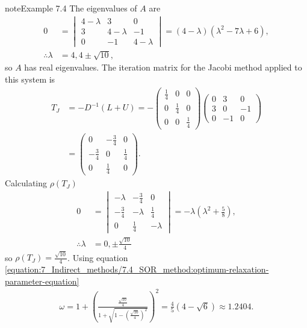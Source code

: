 \documentclass[letterpaper,10pt,english]{jupyterBook}
\begin{document}
\begin{sphinxadmonition}{note}{Example 7.4}
\sphinxAtStartPar
The eigenvalues of \(A\) are
\begin{align*}
    0 &= \begin{vmatrix}
        4 - \lambda & 3 & 0 \\
        3 & 4 - \lambda & -1 \\
        0 & -1 & 4 - \lambda
    \end{vmatrix}
    = (4 - \lambda)(\lambda^2 - 7\lambda + 6), \\
    \therefore \lambda &= 4, 4 \pm \sqrt{10},
\end{align*}
\sphinxAtStartPar
so \(A\) has real eigenvalues. The iteration matrix for the Jacobi method applied to this system is
\begin{align*}
    T_J &= -D^{-1}(L + U)
    = - \begin{pmatrix}
        \frac{1}{4} & 0 & 0 \\ 
        0 & \frac{1}{4} & 0 \\
        0 & 0 & \frac{1}{4}
    \end{pmatrix}
    \begin{pmatrix}
        0 & 3 & 0 \\
        3 & 0 & -1 \\
        0 & -1 & 0 
    \end{pmatrix} \\
    &= \begin{pmatrix}
        0 & -\frac{3}{4} & 0 \\
        -\frac{3}{4} & 0 & \frac{1}{4} \\
        0 & \frac{1}{4} & 0
    \end{pmatrix}.
\end{align*}
\sphinxAtStartPar
Calculating \(\rho(T_J)\)
\begin{align*}
    0 &= \begin{vmatrix}
        -\lambda & -\frac{3}{4} & 0 \\
        -\frac{3}{4} & -\lambda & \frac{1}{4} \\
        0 & \frac{1}{4} & -\lambda
    \end{vmatrix} =
    -\lambda \left( \lambda^2 + \frac{5}{8} \right), \\
    \therefore \lambda &= 0, \pm \frac{\sqrt{10}}{4}
\end{align*}
\sphinxAtStartPar
so \(\rho(T_J) = \frac{\sqrt{10}}{4}\). Using equation \eqref{equation:7_Indirect_methods/7.4_SOR_method:optimum-relaxation-parameter-equation}
\begin{align*}
    \omega = 1 + \left( \frac{\frac{\sqrt{10}}{4}}{1 + \sqrt{1 - (\frac{\sqrt{10}}{4})^2}} \right)^2 = \frac{4}{5}(4 - \sqrt{6}) \approx 1.2404.
\end{align*}\end{sphinxadmonition}
\end{document}
